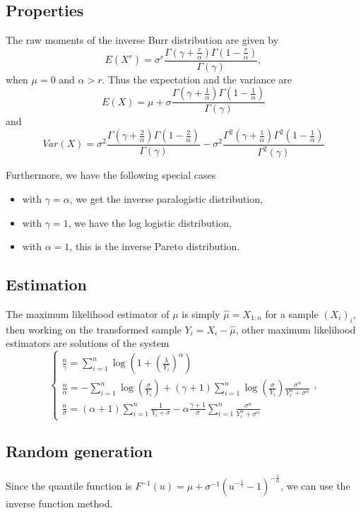 \subsection{Properties}
The raw moments of the inverse Burr distribution are given by
$$
E(X^r) = \sigma^r\frac{\Gamma(\gamma+\frac{r}{\alpha})\Gamma(1-\frac{r}{\alpha})}{\Gamma(\gamma)},
$$
when $\mu=0$ and $\alpha>r$. Thus the expectation and the variance are
$$
E(X) = \mu+\sigma\frac{\Gamma(\gamma+\frac{1}{\alpha})\Gamma(1-\frac{1}{\alpha})}{\Gamma(\gamma)}
$$
and 
$$
Var(X) = \sigma^2\frac{\Gamma(\gamma+\frac{2}{\alpha})\Gamma(1-\frac{2}{\alpha})}{\Gamma(\gamma)}-\sigma^2\frac{\Gamma^2(\gamma+\frac{1}{\alpha})\Gamma^2(1-\frac{1}{\alpha})}{\Gamma^2(\gamma)}
$$

Furthermore, we have the following special cases
\begin{itemize}
\item with $\gamma=\alpha$, we get the inverse paralogistic distribution,
\item with $\gamma=1$, we have the log logistic distribution,
\item with $\alpha=1$, this is the inverse Pareto distribution.
\end{itemize}

\subsection{Estimation}
The maximum likelihood estimator of $\mu$ is simply $\hat\mu=X_{1:n}$ for a sample $(X_i)_i$, then working on the transformed sample $Y_i=X_i-\hat\mu$, other maximum likelihood estimators are solutions of the system
$$
\left\{
\begin{array}{l}
\frac{n}{\gamma}=\sum\limits_{i=1}^n\log \left(1+ \left(\frac{\lambda}{Y_i}\right)^\alpha\right)\\
\frac{n}{\alpha}=-\sum\limits_{i=1}^n\log \left(\frac{\sigma}{Y_i}\right)
+(\gamma+1)\sum\limits_{i=1}^n  \log \left(\frac{\sigma}{Y_i}\right) \frac{\sigma^\alpha}{Y_i^\alpha+\sigma^\alpha}\\
\frac{n}{\sigma} = (\alpha+1)\sum\limits_{i=1}^n\frac{1}{Y_i+\sigma}
-\alpha\frac{\gamma+1}{\sigma}\sum\limits_{i=1}^n\frac{\sigma^\alpha}{Y_i^\alpha+\sigma^\alpha}
\end{array}
\right. ,
$$

\subsection{Random generation}
Since the quantile function is $F^{-1}(u) = \mu+\sigma^{-1}(u^{-\frac{1}{\gamma}}-1)^{-\frac{1}{\alpha}}$, we can use the inverse function method.

